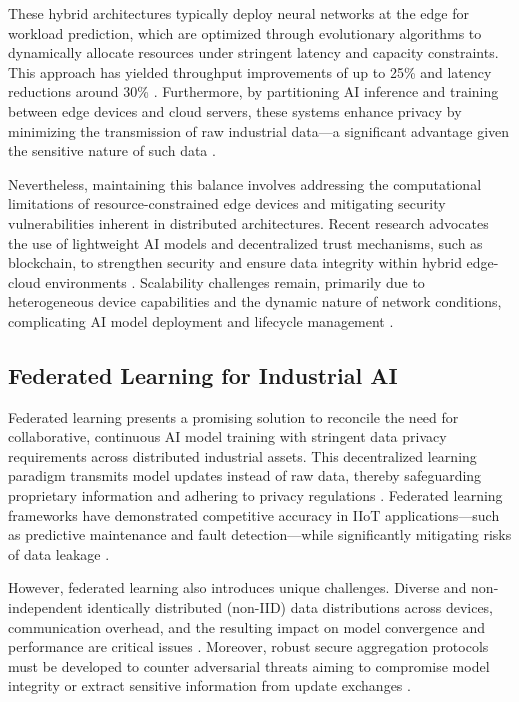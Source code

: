 \documentclass[sigconf]{acmart}
\begin{document}
These hybrid architectures typically deploy neural networks at the edge for workload prediction, which are optimized through evolutionary algorithms to dynamically allocate resources under stringent latency and capacity constraints. This approach has yielded throughput improvements of up to 25\% and latency reductions around 30\% \cite{ref20}. Furthermore, by partitioning AI inference and training between edge devices and cloud servers, these systems enhance privacy by minimizing the transmission of raw industrial data—a significant advantage given the sensitive nature of such data \cite{ref22}.

Nevertheless, maintaining this balance involves addressing the computational limitations of resource-constrained edge devices and mitigating security vulnerabilities inherent in distributed architectures. Recent research advocates the use of lightweight AI models and decentralized trust mechanisms, such as blockchain, to strengthen security and ensure data integrity within hybrid edge-cloud environments \cite{ref31}. Scalability challenges remain, primarily due to heterogeneous device capabilities and the dynamic nature of network conditions, complicating AI model deployment and lifecycle management \cite{ref33}.

\subsection{Federated Learning for Industrial AI}

Federated learning presents a promising solution to reconcile the need for collaborative, continuous AI model training with stringent data privacy requirements across distributed industrial assets. This decentralized learning paradigm transmits model updates instead of raw data, thereby safeguarding proprietary information and adhering to privacy regulations \cite{ref32}. Federated learning frameworks have demonstrated competitive accuracy in IIoT applications—such as predictive maintenance and fault detection—while significantly mitigating risks of data leakage \cite{ref34}.

However, federated learning also introduces unique challenges. Diverse and non-independent identically distributed (non-IID) data distributions across devices, communication overhead, and the resulting impact on model convergence and performance are critical issues \cite{ref36}. Moreover, robust secure aggregation protocols must be developed to counter adversarial threats aiming to compromise model integrity or extract sensitive information from update exchanges \cite{ref37}.
\end{document}
